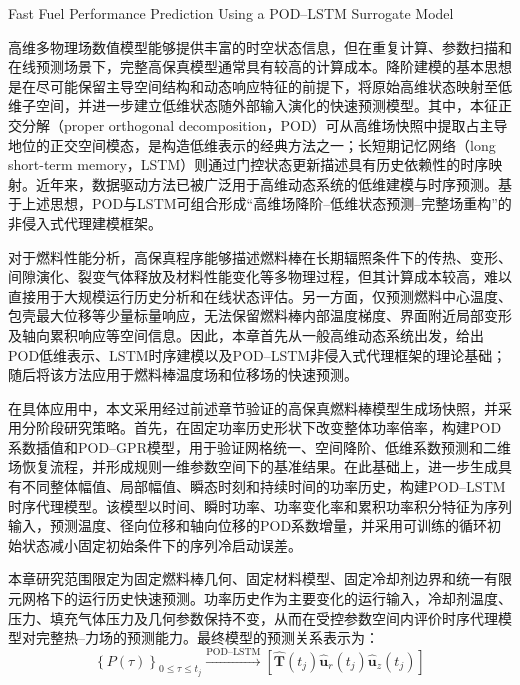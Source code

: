 
{Fast Fuel Performance Prediction Using a POD--LSTM Surrogate Model}


高维多物理场数值模型能够提供丰富的时空状态信息，但在重复计算、参数扫描和在线预测场景下，完整高保真模型通常具有较高的计算成本。降阶建模的基本思想是在尽可能保留主导空间结构和动态响应特征的前提下，将原始高维状态映射至低维子空间，并进一步建立低维状态随外部输入演化的快速预测模型。其中，本征正交分解（proper orthogonal decomposition，POD）可从高维场快照中提取占主导地位的正交空间模态，是构造低维表示的经典方法之一\cite{berkoozProperOrthogonalDecomposition1993,holmesTurbulenceCoherentStructures1996,quarteroniReducedBasisMethods2016}；长短期记忆网络（long short-term memory，LSTM）则通过门控状态更新描述具有历史依赖性的时序映射\cite{hochreiterLongShortTermMemory1997,gersLearningForgetContinual2000}。近年来，数据驱动方法已被广泛用于高维动态系统的低维建模与时序预测\cite{bruntonMachineLearningFluid2020,vlachasDataDrivenForecasting2018}。基于上述思想，POD与LSTM可组合形成“高维场降阶--低维状态预测--完整场重构”的非侵入式代理建模框架。

对于燃料性能分析，高保真程序能够描述燃料棒在长期辐照条件下的传热、变形、间隙演化、裂变气体释放及材料性能变化等多物理过程，但其计算成本较高，难以直接用于大规模运行历史分析和在线状态评估。另一方面，仅预测燃料中心温度、包壳最大位移等少量标量响应，无法保留燃料棒内部温度梯度、界面附近局部变形及轴向累积响应等空间信息。因此，本章首先从一般高维动态系统出发，给出POD低维表示、LSTM时序建模以及POD--LSTM非侵入式代理框架的理论基础；随后将该方法应用于燃料棒温度场和位移场的快速预测。

在具体应用中，本文采用经过前述章节验证的高保真燃料棒模型生成场快照，并采用分阶段研究策略。首先，在固定功率历史形状下改变整体功率倍率，构建POD系数插值和POD--GPR模型，用于验证网格统一、空间降阶、低维系数预测和二维场恢复流程，并形成规则一维参数空间下的基准结果。在此基础上，进一步生成具有不同整体幅值、局部幅值、瞬态时刻和持续时间的功率历史，构建POD--LSTM时序代理模型。该模型以时间、瞬时功率、功率变化率和累积功率积分特征为序列输入，预测温度、径向位移和轴向位移的POD系数增量，并采用可训练的循环初始状态减小固定初始条件下的序列冷启动误差。

本章研究范围限定为固定燃料棒几何、固定材料模型、固定冷却剂边界和统一有限元网格下的运行历史快速预测。功率历史作为主要变化的运行输入，冷却剂温度、压力、填充气体压力及几何参数保持不变，从而在受控参数空间内评价时序代理模型对完整热--力场的预测能力。最终模型的预测关系表示为：
\begin{equation}
	\left\{P(\tau)\right\}_{0\leq\tau\leq t_j}
	\xrightarrow{\mathrm{POD\text{--}LSTM}}
	\left[
	\widehat{\boldsymbol T}(t_j)
	\widehat{\boldsymbol u}_r(t_j)
	\widehat{\boldsymbol u}_z(t_j)
	\right]
	\label{eq:ch6_final_mapping}
\end{equation}

